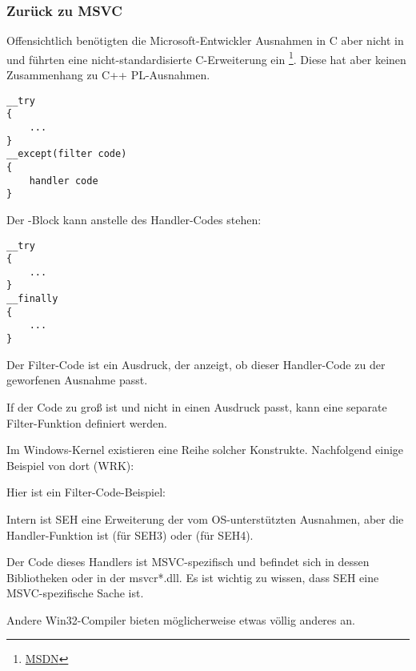 \subsubsection{Zurück zu MSVC}

Offensichtlich benötigten die Microsoft-Entwickler Ausnahmen in C aber nicht in
\Cpp und führten eine nicht-standardisierte C-Erweiterung ein \footnote{\href{http://msdn.microsoft.com/en-us/library/swezty51.aspx}{MSDN}}.
Diese hat aber keinen Zusammenhang zu  C++ \ac{PL}-Ausnahmen.

\begin{lstlisting}[style=customc]
__try
{
    ...
}
__except(filter code)
{
    handler code
}
\end{lstlisting}

Der -Block kann anstelle des Handler-Codes stehen:

\begin{lstlisting}[style=customc]
__try
{
    ...
}
__finally
{
    ...
}
\end{lstlisting}

Der Filter-Code ist ein Ausdruck, der anzeigt, ob dieser Handler-Code zu der
geworfenen Ausnahme passt.

If der Code zu groß ist und nicht in einen Ausdruck passt, kann eine separate
Filter-Funktion definiert werden.

Im Windows-Kernel existieren eine Reihe solcher Konstrukte.
Nachfolgend einige Beispiel von dort (\ac{WRK}):





Hier ist ein Filter-Code-Beispiel:



Intern ist SEH eine Erweiterung der vom \ac{OS}-unterstützten Ausnahmen,
aber die Handler-Funktion ist  (für SEH3) oder  (für SEH4).

Der Code dieses Handlers ist MSVC-spezifisch und befindet sich in dessen Bibliotheken
oder in der msvcr*.dll.
Es ist wichtig zu wissen, dass SEH eine MSVC-spezifische Sache ist.

Andere Win32-Compiler bieten möglicherweise etwas völlig anderes an.

